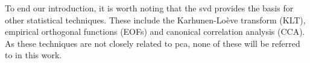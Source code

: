 To end our introduction, it is worth noting that the \gls{svd} provides the basis for other statistical techniques.
These include the Karhunen-Loève transform (KLT), empirical orthogonal functions (EOFs) and canonical correlation analysis (CCA).
As these techniques are not closely related to \gls{pca}, none of these will be referred to in this work.





\clearpage





